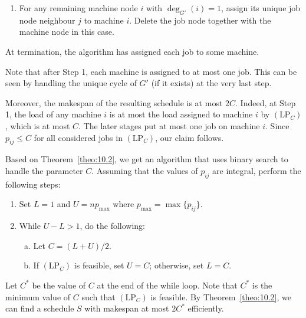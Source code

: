\begin{pf}
\begin{enumerate}
        \item For any remaining machine node $i$ with $\deg_{G'}(i) = 1$, 
        assign its unique job node neighbour $j$ to machine $i$. Delete 
        the job node together with the machine node in this case. 
    \end{enumerate}
    At termination, the algorithm has assigned each job to some machine. 

    Note that after Step 1, each machine is assigned to at most one job. 
    This can be seen by handling the unique cycle of $G'$ 
    (if it exists) at the very last step. 

    Moreover, the makespan of the resulting schedule is at most $2C$. 
    Indeed, at Step 1, the load of any machine $i$ is at most the 
    load assigned to machine $i$ by $(\text{LP}_C)$, which is at most $C$. 
    The later stages put at most one job on machine $i$. Since 
    $p_{ij} \leq C$ for all considered jobs in $(\text{LP}_C)$, our 
    claim follows. 
\end{pf}

Based on Theorem~\ref{theo:10.2}, we get an algorithm that uses 
binary search to handle the parameter $C$. Assuming that the values of 
$p_{ij}$ are integral, perform the following steps: 
\begin{enumerate}
    \item Set $L = 1$ and $U = np_{\max}$ where $p_{\max} = \max\{p_{ij}\}$. 
    \item While $U - L > 1$, do the following: 
    \begin{enumerate}[(a)]
        \item Let $C = (L + U)/2$. 
        \item If $(\text{LP}_C)$ is feasible, set $U = C$; otherwise, set $L = C$. 
    \end{enumerate}
\end{enumerate}
Let $C^*$ be the value of $C$ at the end of the while loop. Note that 
$C^*$ is the minimum value of $C$ such that $(\text{LP}_C)$ is feasible. 
By Theorem~\ref{theo:10.2}, we can find a schedule $S$ with makespan 
at most $2C^*$ efficiently. 